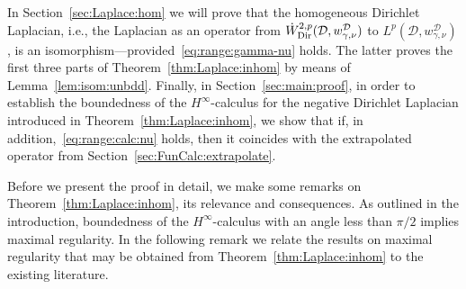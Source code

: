 \documentclass[12pt,a4paper, reqno]{amsart}
\theoremstyle{plain}
\theoremstyle{definition}
\theoremstyle{remark}
\numberwithin{equation}{section}
\newcommand{\1}{\mathbbm{1}}
\newcommand{\calD}{\ensuremath{\mathcal{D}}}
\newcommand{\Dir}{\textup{Dir}}
\begin{document}
In Section~\ref{sec:Laplace:hom} we will prove that the homogeneous  Dirichlet Laplacian, i.e., the Laplacian as an operator from $\Dot{W}^{2,p}_\Dir(\calD,w_{\gamma,\nu}^\calD)$ to $L^p(\calD,w_{\gamma,\nu}^\calD)$, is an isomorphism---provided~\eqref{eq:range:gamma-nu} holds. 
The latter proves the first three parts of Theorem~\ref{thm:Laplace:inhom} by means of Lemma~\ref{lem:isom:unbdd}. 
Finally, in Section~\ref{sec:main:proof}, in order to establish the boundedness of the $H^\infty$-calculus for the negative Dirichlet Laplacian introduced in Theorem~\ref{thm:Laplace:inhom}, we show that if,  in addition,~\eqref{eq:range:calc:nu} holds, then it coincides with the extrapolated operator from Section~\ref{sec:FunCalc:extrapolate}.

Before we present the proof in detail, we make some remarks on Theorem~\ref{thm:Laplace:inhom}, its relevance and consequences. 
As outlined in the introduction, boundedness of the $H^\infty$-calculus with an angle less than $\pi/2$ implies maximal regularity. In the following remark we relate the results on maximal regularity that may be obtained from Theorem~\ref{thm:Laplace:inhom} to the existing literature. 
\end{document}
